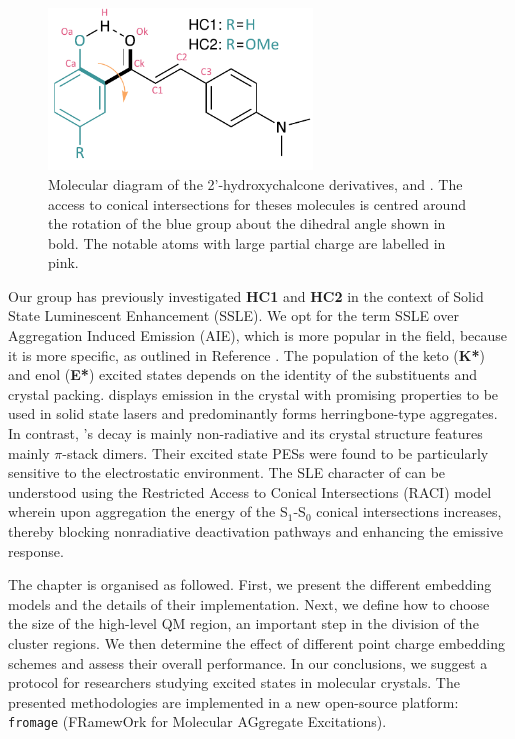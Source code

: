 \begin{figure}
\centering
\includegraphics[width=7cm]{Chapters/5Ewald/molecules.pdf}
\caption{Molecular diagram of the 2’-hydroxychalcone derivatives, \HC{} and \HCC{}. The access to conical intersections for theses molecules is centred around the rotation of the blue group about the dihedral angle shown in bold. The notable atoms with large partial charge are labelled in pink.}
\label{fig:molecules}
\end{figure}

Our group has previously investigated \textbf{HC1} and \textbf{HC2} in the context of Solid State Luminescent Enhancement (SSLE).\cite{Dommett2017a,Dommett2017c} We opt for the term SSLE over Aggregation Induced Emission (AIE), which is more popular in the field, because it is more specific, as outlined in Reference .
The population of the keto (\textbf{K*}) and enol (\textbf{E*}) excited states depends on the identity of the substituents and crystal packing.\cite{Dommett2017c} \HC{} displays emission in the crystal with promising properties to be used in solid state lasers\cite{Zhang2015} and predominantly forms herringbone-type aggregates. In contrast, \HCC{}'s decay is mainly non-radiative and its crystal structure features mainly $\pi$-stack dimers. Their excited state PESs were found to be particularly sensitive to the electrostatic environment. The SLE character of \HC{} can be understood using the Restricted Access to Conical Intersections (RACI) model\cite{Blancafort2018,Li2013a} wherein upon aggregation the energy of the S$_1$-S$_0$ conical intersections increases, thereby blocking nonradiative deactivation pathways and enhancing the emissive response.

The chapter is organised as followed. First, we present the different embedding models and the details of their implementation. Next, we define how to choose the size of the high-level QM region, an important step in the division of the cluster regions. We then determine the effect of different point charge embedding schemes and assess their overall performance. In our conclusions, we suggest a protocol for researchers studying excited states in molecular crystals. The presented methodologies are implemented in a new open-source platform: \texttt{fromage} (FRamewOrk for Molecular AGgregate Excitations). 


